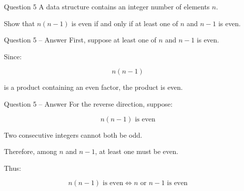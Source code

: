 
\begin{frame}{Question 5}
A data structure contains an integer number of elements $n$.

Show that $n(n-1)$ is even if and only if at least one of $n$ and $n-1$
is even.
\end{frame}

\begin{frame}{Question 5 -- Answer}
First, suppose at least one of $n$ and $n-1$ is even.

Since:

$$
n(n-1)
$$

is a product containing an even factor, the product is even.
\end{frame}

\begin{frame}{Question 5 -- Answer}
For the reverse direction, suppose:

$$
n(n-1)\text{ is even}
$$

Two consecutive integers cannot both be odd.

Therefore, among $n$ and $n-1$, at least one must be even.

Thus:

$$
\boxed{n(n-1)\text{ is even}
\iff
n\text{ or }n-1\text{ is even}}
$$

\end{frame}
